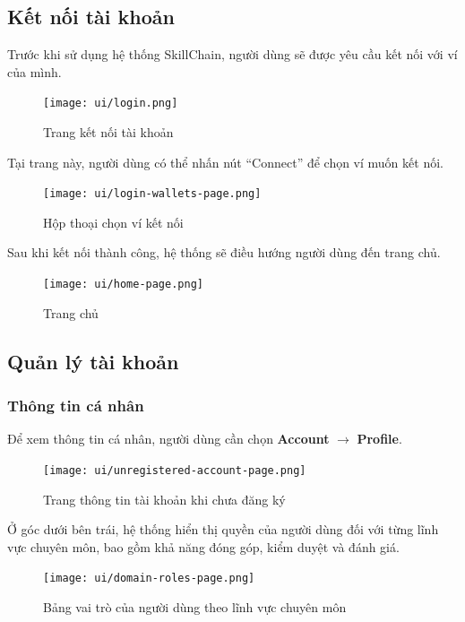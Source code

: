\subsection{Kết nối tài khoản}

Trước khi sử dụng hệ thống SkillChain, người dùng sẽ được yêu cầu kết nối với ví của mình.

\begin{figure}[H]
  \centering
  \texttt{[image: ui/login.png]}
  \caption{Trang kết nối tài khoản}
  \label{fig:login-page}
\end{figure}

Tại trang này, người dùng có thể nhấn nút ``Connect'' để chọn ví muốn kết nối.

\begin{figure}[H]
  \centering
  \texttt{[image: ui/login-wallets-page.png]}
  \caption{Hộp thoại chọn ví kết nối}
  \label{fig:login-wallets-page}
\end{figure}

Sau khi kết nối thành công, hệ thống sẽ điều hướng người dùng đến trang chủ.

\begin{figure}[H]
  \centering
  \texttt{[image: ui/home-page.png]}
  \caption{Trang chủ}
  \label{fig:home-page}
\end{figure}

\subsection{Quản lý tài khoản}

\subsubsection{Thông tin cá nhân}

Để xem thông tin cá nhân, người dùng cần chọn \textbf{Account} $\rightarrow$ \textbf{Profile}.

\begin{figure}[H]
  \centering
  \texttt{[image: ui/unregistered-account-page.png]}
  \caption{Trang thông tin tài khoản khi chưa đăng ký}
  \label{fig:unregistered-account-page}
\end{figure}

Ở góc dưới bên trái, hệ thống hiển thị quyền của người dùng đối với từng lĩnh vực chuyên môn, bao gồm khả năng đóng góp, kiểm duyệt và đánh giá.

\begin{figure}[H]
  \centering
  \texttt{[image: ui/domain-roles-page.png]}
  \caption{Bảng vai trò của người dùng theo lĩnh vực chuyên môn}
  \label{fig:domain-roles-page}
\end{figure}

